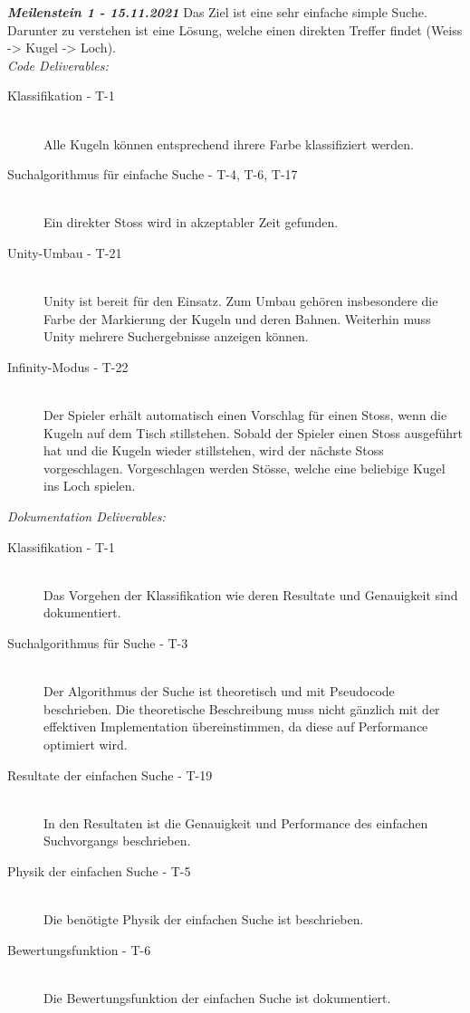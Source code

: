 \textit{\textbf{Meilenstein 1 - 15.11.2021}}
Das Ziel ist eine sehr einfache simple Suche. Darunter zu verstehen ist eine Lösung, welche einen direkten Treffer findet
(Weiss -> Kugel -> Loch).\\
\textit{Code Deliverables:}
\begin{description}
    \item[Klassifikation - T-1]\hfill \\
    Alle Kugeln können entsprechend ihrere Farbe klassifiziert werden.
    \item[Suchalgorithmus für einfache Suche - T-4, T-6, T-17]\hfill \\
    Ein direkter Stoss wird in akzeptabler Zeit gefunden.
    \item[Unity-Umbau - T-21]\hfill \\
    Unity ist bereit für den Einsatz. Zum Umbau gehören insbesondere die Farbe der Markierung der Kugeln und deren
    Bahnen. Weiterhin muss Unity mehrere Suchergebnisse anzeigen können.
    \item[Infinity-Modus - T-22]\hfill \\
    Der Spieler erhält automatisch einen Vorschlag für einen Stoss, wenn die Kugeln auf dem Tisch stillstehen.
    Sobald der Spieler einen Stoss ausgeführt hat und die Kugeln wieder stillstehen, wird der nächste Stoss vorgeschlagen.
    Vorgeschlagen werden Stösse, welche eine beliebige Kugel ins Loch spielen.
\end{description}
\textit{Dokumentation Deliverables:}
\begin{description}
    \item[Klassifikation - T-1]\hfill \\
    Das Vorgehen der Klassifikation wie deren Resultate und Genauigkeit sind dokumentiert.
    \item[Suchalgorithmus für Suche - T-3]\hfill \\
    Der Algorithmus der Suche ist theoretisch und mit Pseudocode beschrieben.
    Die theoretische Beschreibung muss nicht gänzlich mit der effektiven Implementation übereinstimmen, da diese auf
    Performance optimiert wird.
    \item[Resultate der einfachen Suche - T-19]\hfill \\
    In den Resultaten ist die Genauigkeit und Performance des einfachen Suchvorgangs
    beschrieben.
    \item[Physik der einfachen Suche - T-5]\hfill \\
    Die benötigte Physik der einfachen Suche ist beschrieben.
    \item[Bewertungsfunktion - T-6]\hfill \\
    Die Bewertungsfunktion der einfachen Suche ist dokumentiert.
\end{description}


